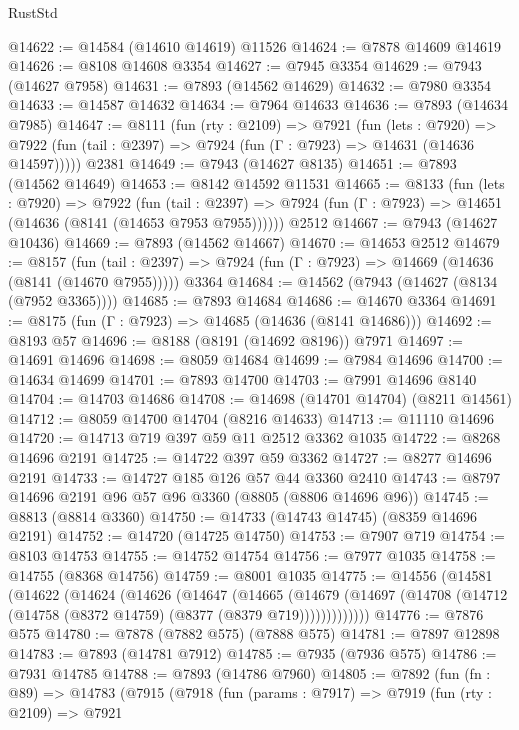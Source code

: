 \begin{lexlean}{RustStd}
\begin{coremodule}
{\begin{coremodule}
{{{{{{{{{{{{{{{{{{{{{{{{{{{{{{{{{{{{{{{{{{{{{{{{{{@14622 := @14584 (@14610 @14619) @11526
@14624 := @7878 @14609 @14619
@14626 := @8108 @14608 @3354
@14627 := @7945 @3354
@14629 := @7943 (@14627 @7958)
@14631 := @7893 (@14562 @14629)
@14632 := @7980 @3354
@14633 := @14587 @14632
@14634 := @7964 @14633
@14636 := @7893 (@14634 @7985)
@14647 := @8111
    (fun (rty : @2109) =>
    @7921
      (fun (lets : @7920) =>
      @7922 (fun (tail : @2397) => @7924 (fun (Γ : @7923) => @14631 (@14636 @14597)))))
    @2381
@14649 := @7943 (@14627 @8135)
@14651 := @7893 (@14562 @14649)
@14653 := @8142 @14592 @11531
@14665 := @8133
    (fun (lets : @7920) =>
    @7922
      (fun (tail : @2397) =>
      @7924 (fun (Γ : @7923) => @14651 (@14636 (@8141 (@14653 @7953 @7955))))))
    @2512
@14667 := @7943 (@14627 @10436)
@14669 := @7893 (@14562 @14667)
@14670 := @14653 @2512
@14679 := @8157
    (fun (tail : @2397) => @7924 (fun (Γ : @7923) => @14669 (@14636 (@8141 (@14670 @7955)))))
    @3364
@14684 := @14562 (@7943 (@14627 (@8134 (@7952 @3365))))
@14685 := @7893 @14684
@14686 := @14670 @3364
@14691 := @8175 (fun (Γ : @7923) => @14685 (@14636 (@8141 @14686)))
@14692 := @8193 @57
@14696 := @8188 (@8191 (@14692 @8196)) @7971
@14697 := @14691 @14696
@14698 := @8059 @14684
@14699 := @7984 @14696
@14700 := @14634 @14699
@14701 := @7893 @14700
@14703 := @7991 @14696 @8140
@14704 := @14703 @14686
@14708 := @14698 (@14701 @14704) (@8211 @14561)
@14712 := @8059 @14700 @14704 (@8216 @14633)
@14713 := @11110 @14696
@14720 := @14713 @719 @397 @59 @11 @2512 @3362 @1035
@14722 := @8268 @14696 @2191
@14725 := @14722 @397 @59 @3362
@14727 := @8277 @14696 @2191
@14733 := @14727 @185 @126 @57 @44 @3360 @2410
@14743 := @8797 @14696 @2191 @96 @57 @96 @3360 (@8805 (@8806 @14696 @96))
@14745 := @8813 (@8814 @3360)
@14750 := @14733 (@14743 @14745) (@8359 @14696 @2191)
@14752 := @14720 (@14725 @14750)
@14753 := @7907 @719
@14754 := @8103 @14753
@14755 := @14752 @14754
@14756 := @7977 @1035
@14758 := @14755 (@8368 @14756)
@14759 := @8001 @1035
@14775 := @14556
    (@14581
      (@14622
        (@14624
          (@14626
            (@14647
              (@14665
                (@14679
                  (@14697 (@14708 (@14712 (@14758 (@8372 @14759) (@8377 (@8379 @719)))))))))))))
@14776 := @7876 @575
@14780 := @7878 (@7882 @575) (@7888 @575)
@14781 := @7897 @12898
@14783 := @7893 (@14781 @7912)
@14785 := @7935 (@7936 @575)
@14786 := @7931 @14785
@14788 := @7893 (@14786 @7960)
@14805 := @7892
    (fun (fn : @89) =>
    @14783
      (@7915
        (@7918
          (fun (params : @7917) =>
          @7919
            (fun (rty : @2109) =>
            @7921
}}}}}}}}}}}}}}}}}}}}}}}}}}}}}}}}}}}}}}}}}}}}}}}}}}
\end{coremodule}}
\end{coremodule}
\end{lexlean}
